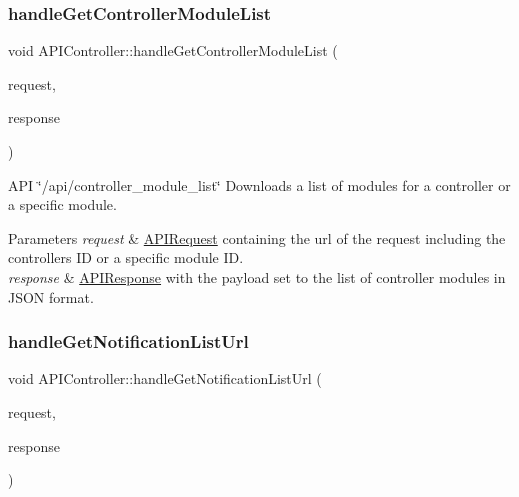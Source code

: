 \subsubsection{\texorpdfstring{handle\+Get\+Controller\+Module\+List}{handleGetControllerModuleList}}
{\footnotesize\ttfamily void A\+P\+I\+Controller\+::handle\+Get\+Controller\+Module\+List (\begin{DoxyParamCaption}\item[{const \hyperlink{class_a_p_i_request}{A\+P\+I\+Request} \&}]{request,  }\item[{\hyperlink{class_a_p_i_response}{A\+P\+I\+Response} $\ast$}]{response }\end{DoxyParamCaption})\hspace{0.3cm}{\ttfamily [slot]}}

A\+PI \char`\"{}/api/controller\+\_\+module\+\_\+list\char`\"{} Downloads a list of modules for a controller or a specific module. 
\begin{DoxyParams}{Parameters}
{\em request} & \hyperlink{class_a_p_i_request}{A\+P\+I\+Request} containing the url of the request including the controller\textquotesingle{}s ID or a specific module ID. \\
\hline
{\em response} & \hyperlink{class_a_p_i_response}{A\+P\+I\+Response} with the payload set to the list of controller modules in J\+S\+ON format. \\
\hline
\end{DoxyParams}
\mbox{\label{class_a_p_i_controller_a3217b84dcc811d83e4c7241a5e19c35c}} 
\subsubsection{\texorpdfstring{handle\+Get\+Notification\+List\+Url}{handleGetNotificationListUrl}}
{\footnotesize\ttfamily void A\+P\+I\+Controller\+::handle\+Get\+Notification\+List\+Url (\begin{DoxyParamCaption}\item[{const \hyperlink{class_a_p_i_request}{A\+P\+I\+Request} \&}]{request,  }\item[{\hyperlink{class_a_p_i_response}{A\+P\+I\+Response} $\ast$}]{response }\end{DoxyParamCaption})\hspace{0.3cm}{\ttfamily [slot]}}

